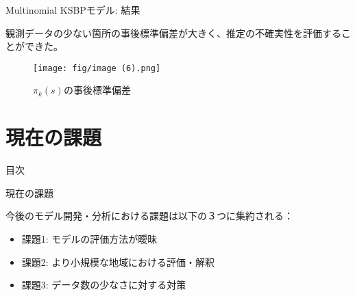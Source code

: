 \documentclass[xelatex, 8pt]{beamer}
\theoremstyle{plain}
\theoremstyle{definition}
\begin{document}
\begin{frame}{Multinomial KSBPモデル: 結果}

観測データの少ない箇所の事後標準偏差が大きく、推定の不確実性を評価することができた。

\begin{figure}
    \centering
    \texttt{[image: fig/image (6).png]}
    \caption{$\pi_k(s)$の事後標準偏差}
    \label{fig:enter-label}
\end{figure}
\end{frame}

\section{現在の課題}

\begin{frame}
{\Large 目次}
 \tableofcontents[currentsection]
\end{frame}

\begin{frame}{現在の課題}

    今後のモデル開発・分析における課題は以下の３つに集約される：

    \begin{itemize}
        \item 課題1: モデルの評価方法が曖昧
        \item 課題2: より小規模な地域における評価・解釈
        \item 課題3: データ数の少なさに対する対策
    \end{itemize}

\end{frame}
\end{document}
